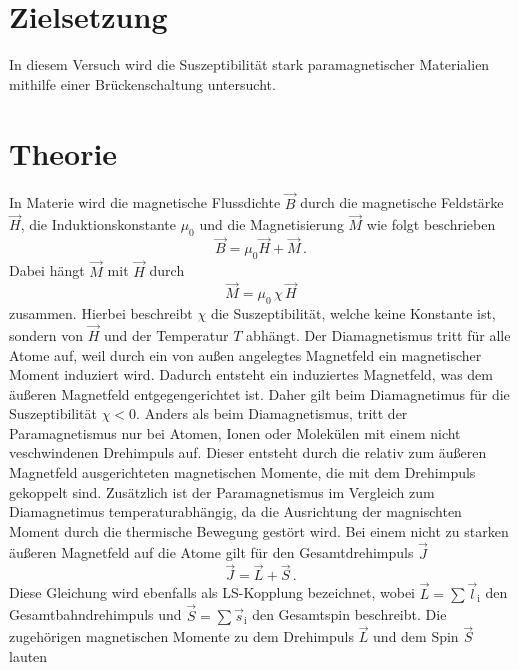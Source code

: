 \section{Zielsetzung}
\label{sec:Zielsetzung}
In diesem Versuch wird die Suszeptibilität stark paramagnetischer Materialien 
mithilfe einer Brückenschaltung untersucht. 
\nocite{anleitungV606}
\section{Theorie}
\label{sec:Theorie}
In Materie wird die magnetische Flussdichte $\vec{B}$ durch die magnetische Feldstärke
$\vec{H}$, die Induktionskonstante $\mu _0$ und die Magnetisierung $\vec{M}$ wie folgt beschrieben
\begin{equation}
    \vec{B} = \mu _0 \vec{H} + \vec{M}\,.
    \label{eqn:magnetischeFlussdichte}
\end{equation}
Dabei hängt $\vec{M}$ mit $\vec{H}$ durch 
\begin{equation}
    \vec{M} = \mu _0\, \chi\, \vec{H}
    \label{eqn:Magnetisierung}
\end{equation}
zusammen. Hierbei beschreibt $\chi$ die Suszeptibilität, welche keine Konstante ist, sondern von $\vec{H}$ und der Temperatur $T$ abhängt.
Der Diamagnetismus tritt für alle Atome auf, weil durch ein von außen angelegtes Magnetfeld ein magnetischer Moment induziert wird. Dadurch
entsteht ein induziertes Magnetfeld, was dem äußeren Magnetfeld entgegengerichtet ist. Daher gilt beim Diamagnetimus für die Suszeptibilität
$\chi < 0 $. Anders als beim Diamagnetismus, tritt der Paramagnetismus nur bei Atomen, Ionen oder Molekülen mit einem nicht veschwindenen Drehimpuls auf.
Dieser entsteht durch die relativ zum äußeren Magnetfeld ausgerichteten magnetischen Momente, die mit dem Drehimpuls gekoppelt sind. Zusätzlich ist der
Paramagnetismus im Vergleich zum Diamagnetimus temperaturabhängig, da die Ausrichtung der magnischten Moment durch
die thermische Bewegung gestört wird. Bei einem nicht zu starken äußeren Magnetfeld auf die Atome gilt für den Gesamtdrehimpuls $\vec{J}$
\begin{equation}
    \vec{J} = \vec{L} + \vec{S}\,.
    \label{eqn:Gesamtdrehimpuls}
\end{equation}
Diese Gleichung wird ebenfalls als LS-Kopplung bezeichnet, wobei $\vec{L} = \sum{\vec{l}_{\text{i}}}$ den Gesamtbahndrehimpuls und 
$\vec{S} = \sum{\vec{s}_{\text{i}}}$ den Gesamtspin beschreibt.
Die zugehörigen magnetischen Momente zu dem Drehimpuls $\vec{L}$ und dem Spin $\vec{S}$ lauten
